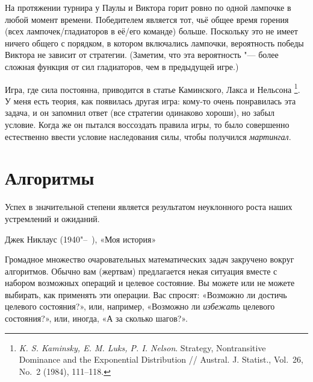 \documentclass[twoside]{book}
\begin{document}
На протяжении турнира у Паулы и Виктора горит ровно по одной лампочке в любой момент времени.
Победителем является тот, чьё общее время горения (всех лампочек/гладиаторов в её/его команде) больше.
Поскольку это не имеет ничего общего с порядком, в котором включались лампочки, вероятность победы Виктора не зависит от стратегии.
(Заметим, что эта вероятность "--- более сложная функция от сил гладиаторов, чем в предыдущей игре.)
\heart

Игра, где сила постоянна, приводится в статье Каминского, Лакса и Нельсона%
\footnote{\emph{K. S. Kaminsky, E. M. Luks, P. I. Nelson}. Strategy, Nontransitive Dominance and the Exponential Distribution /\!/ {Austral. J. Statist.}, Vol.~26, No.~2 (1984), 111--118.}.
У меня есть теория, как появилась другая игра: кому-то очень понравилась эта задача, и он запомнил ответ (все стратегии одинаково хороши), но забыл условие.
Когда же он пытался воссоздать правила игры, то было совершенно естественно ввести условие наследования силы, чтобы получился \emph{мартингал}.



\chapter{Алгоритмы}


\setlength{\epigraphwidth}{.65\textwidth}
\epigraph{Успех в значительной степени является результатом неуклонного роста наших устремлений и ожиданий.\vspace{1ex}}{Джек Никлаус (1940"--~), «Моя история»}



Громадное множество очаровательных математических задач закручено вокруг алгоритмов.
Обычно вам (жертвам) %
предлагается некая ситуация вместе с набором возможных операций и целевое состояние.
Вы можете или не можете выбирать, как применять эти операции.
Вас спросят: «Возможно ли достичь целевого состояния?», или, например, «Возможно ли \emph{избежать} целевого состояния?», или, иногда, «А за сколько шагов?».
\end{document}
